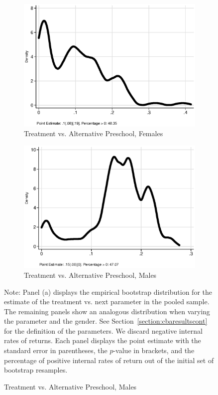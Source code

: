 \begin{figure}
\begin{subfigure}[h]{0.25\textwidth}
\end{subfigure}%
\begin{subfigure}[h]{0.25\textwidth}
	\centering
	\caption{Treatment vs. Alternative Preschool, Females}
		\includegraphics[width=\textwidth]{output/irr_8_sexf.eps}
\end{subfigure}%
\begin{subfigure}[h]{0.25\textwidth}
	\centering
	\caption{Treatment vs. Alternative Preschool, Males}
		\includegraphics[width=\textwidth]{output/irr_8_sexm.eps}
\end{subfigure}
\footnotesize \justify
Note: Panel (a) displays the empirical bootstrap distribution for the estimate of the treatment vs. next parameter in the pooled sample. The remaining panels show an analogous distribution when varying the parameter and the gender. See Section~\ref{section:cbaresultscont} for the definition of the parameters. We discard negative internal rates of returns. Each panel displays the point estimate with the standard error in parentheses, the $p$-value in brackets, and the percentage of positive internal rates of return out of the initial set of bootstrap resamples.
\end{figure}
\restoregeometry
\doublespacing




